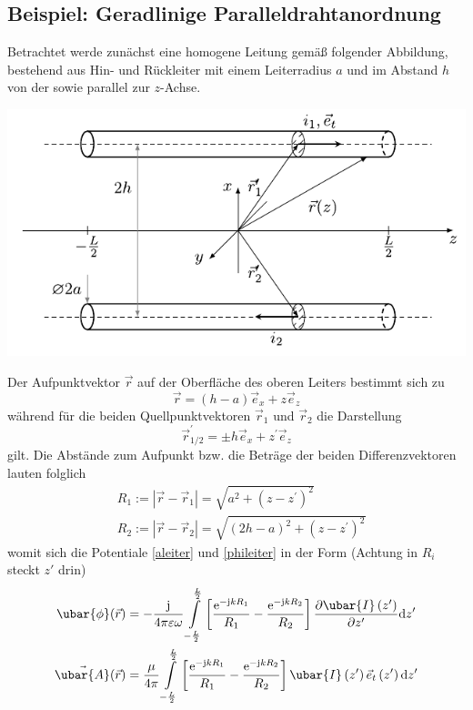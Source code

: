 \subsection{Beispiel: Geradlinige Paralleldrahtanordnung}
Betrachtet werde zunächst eine homogene Leitung gemäß folgender Abbildung, bestehend aus Hin- und Rückleiter mit einem Leiterradius $a$ und im Abstand $h$ von der sowie parallel zur $z$-Achse.
\begin{center}
	\includegraphics{res/LT17}
\end{center}
Der Aufpunktvektor $\vec{r}$ auf der Oberfläche des oberen Leiters bestimmt sich zu
\begin{equation}
	\vec{r}=(h-a) \vec{e}_{x}+z \vec{e}_{z} 
\end{equation}
während für die beiden Quellpunktvektoren $\vec{r}_{1}$ und $\vec{r}_{2}$ die Darstellung
\begin{equation}
	\vec{r}_{1 / 2}^{\prime}= \pm h \vec{e}_{x}+z^{\prime} \vec{e}_{z} 
\end{equation}
gilt. Die Abstände zum Aufpunkt bzw. die Beträge der beiden Differenzvektoren lauten folglich
\begin{align}
	& R_{1}:=\left|\vec{r}-\vec{r}_{1}\right|=\sqrt{a^{2}+\left(z-z^{\prime}\right)^{2}}  \\
	& R_{2}:=\left|\vec{r}-\vec{r}_{2}\right|=\sqrt{(2 h-a)^{2}+\left(z-z^{\prime}\right)^{2}} 
\end{align}
womit sich die Potentiale \ref{aleiter} und \ref{phileiter} in der Form (Achtung in $R_i$ steckt $z'$ drin)
\begin{align}
	 \ubar{\phi}(\vec{r})&=-\frac{\mathrm{j}}{4 \pi \varepsilon \omega} \int\limits_{-\frac{L}{2}}^{\frac{L}{2}}\left[\frac{\mathrm{e}^{-\mathrm{j} k R_{1}}}{R_{1}}-\frac{\mathrm{e}^{-\mathrm{j} k R_{2}}}{R_{2}}\right] \frac{\partial \ubar{I}\left(z^{\prime}\right)}{\partial z^{\prime}} \mathrm{d} z^{\prime}\label{LTform3}  \\
	\vec{\ubar{A}}(\vec{r})&=\frac{\mu}{4 \pi} \int\limits_{-\frac{L}{2}}^{\frac{L}{2}}\left[\frac{\mathrm{e}^{-\mathrm{j} k R_{1}}}{R_{1}}-\frac{\mathrm{e}^{-\mathrm{j} k R_{2}}}{R_{2}}\right] \ubar{I}\left(z^{\prime}\right) \vec{e}_{t}\left(z^{\prime}\right) \mathrm{d} z^{\prime} 
\end{align}

